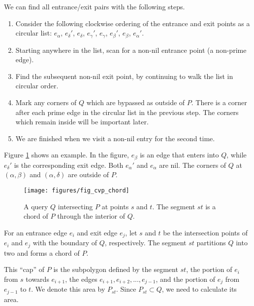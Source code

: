 We can find all entrance/exit pairs with the following steps.
\begin{enumerate}
 \item Consider the following clockwise ordering of the entrance and exit points as a circular list: $e_\alpha$, $e_\delta'$, $e_\delta$, $e_\gamma'$, $e_\gamma$, $e_\beta'$, $e_\beta$, $e_\alpha'$.
 
 \item Starting anywhere in the list, scan for a non-nil entrance point (a non-prime edge).
 
 \item Find the subsequent non-nil exit point, by continuing to walk the list in circular order.
 
 \item Mark any corners of $Q$ which are bypassed as outside of $P$. There is a corner after each prime edge in the circular list in the previous step. The corners which remain inside will be important later.
 
 \item We are finished when we visit a non-nil entry for the second time.
\end{enumerate}

Figure \ref{fig:convexp:chord} shows an example. In the figure, $e_\beta$ is an edge that enters into $Q$, while $e_\delta'$ is the corresponding exit edge. Both $e_\alpha'$ and $e_\alpha$ are nil. The corners of $Q$ at $(\alpha, \beta)$ and $(\alpha, \delta)$ are outside of $P$.

\begin{figure}
\begin{center}
  \texttt{[image: figures/fig\_cvp\_chord]}
  \caption[A query $Q$ intersecting $P$ at points $s$ and $t$]{A query $Q$ intersecting $P$ at points $s$ and $t$. The segment $st$ is a chord of $P$ through the interior of $Q$.}
  \label{fig:convexp:chord}
\end{center}
\end{figure}

For an entrance edge $e_i$ and exit edge $e_j$, let $s$ and $t$ be the intersection points of $e_i$ and $e_j$ with the boundary of $Q$, respectively. The segment $st$ partitions $Q$ into two and forms a chord of $P$.

This ``cap'' of $P$ is the subpolygon defined by the segment $st$, the portion of $e_i$ from $s$ towards $e_{i+1}$, the edges $e_{i+1}, e_{i+2}, ..., e_{j-1}$, and the portion of $e_j$ from $e_{j-1}$ to $t$. We denote this area by $P_{st}$. Since $P_{st} \subset Q$, we need to calculate its area.

